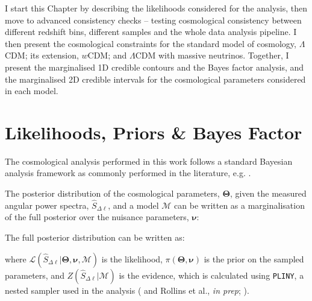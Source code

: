 \qquad I start this Chapter by describing the likelihoods considered for the analysis, then move to advanced consistency checks -- testing cosmological consistency between different redshift bins, different samples and the whole data analysis pipeline. I then present the cosmological constraints for the standard model of cosmology, $\Lambda$CDM; its extension, $w$CDM; and $\Lambda$CDM with massive neutrinos. Together, I present the marginalised 1D credible contours and the Bayes factor analysis, and the marginalised 2D credible intervals for the cosmological parameters considered in each model.

\section{Likelihoods, Priors \& Bayes Factor}\label{Sec:LikelihoodsPriors}

The cosmological analysis performed in this work follows a standard Bayesian analysis framework as commonly performed in the literature, e.g. \cite{Blake2007,Thomas2011,2017MNRAS.465.1454H,2017arXiv170801530D}. 

\qquad The posterior distribution of the cosmological parameters, $\pmb{\Theta}$, given the measured angular power spectra, $\hat{S}_{\Delta\ell}$, and a model $\mathcal{M}$ can be written as a marginalisation of the full posterior over the nuisance parameters, $\pmb{\nu}$:

The full posterior distribution can be written as:

where $\mathcal{L}(\hat{S}_{\Delta\ell}|\pmb{\Theta}, \pmb{\nu}, \mathcal{M})$ is the likelihood, $\pi(\pmb{\Theta}, \pmb{\nu})$ is the prior on the sampled parameters, and $Z({\hat{S}_{\Delta\ell}}| \mathcal{M})$ is the evidence, which is calculated using \texttt{PLINY}, a nested sampler used in the analysis (\citealt{PlinyRichardThesis} and Rollins et al., \textit{in prep}; \cite{2008FerozHobson}).


